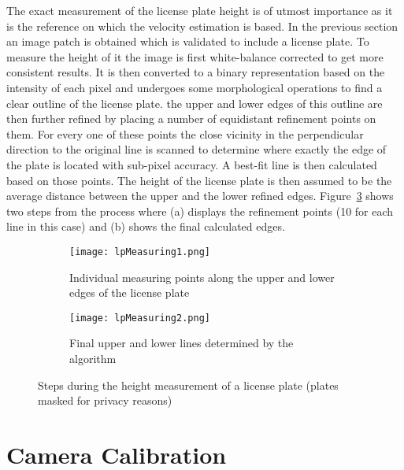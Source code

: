 The exact measurement of the license plate height is of utmost importance as it is the reference on which the velocity estimation is based.
In the previous section an image patch is obtained which is validated to include a license plate.
To measure the height of it the image is first white-balance corrected to get more consistent results.
It is then converted to a binary representation based on the intensity of each pixel and undergoes some morphological operations to find a clear outline of the license plate.
the upper and lower edges of this outline are then further refined by placing a number of equidistant refinement points on them.
For every one of these points the close vicinity in the perpendicular direction to the original line is scanned to determine where exactly the edge of the plate is located with sub-pixel accuracy.
A best-fit line is then calculated based on those points.
The height of the license plate is then assumed to be the average distance between the upper and the lower refined edges.
Figure~\ref{fig:lpMeasuring} shows two steps from the process where (a) displays the refinement points (10 for each line in this case) and (b) shows the final calculated edges.


\begin{figure}
    \centering
    \begin{subfigure}{.47\textwidth}
        \centering
        \texttt{[image: lpMeasuring1.png]}
        \caption{Individual measuring points along the upper and lower edges of the license plate}
        \label{fig:lpMeasuring1.png}
    \end{subfigure}%
    \hspace{.05\textwidth}
    \begin{subfigure}{.47\textwidth}
        \centering
        \texttt{[image: lpMeasuring2.png]}
        \caption{Final upper and lower lines determined by the algorithm}
        \label{fig:lpMeasuring2.png}
    \end{subfigure}
    \caption[Steps during the height measurement of a license plate]{Steps during the height measurement of a license plate (plates masked for privacy reasons)}
    \label{fig:lpMeasuring}
\end{figure}


\section{Camera Calibration}


